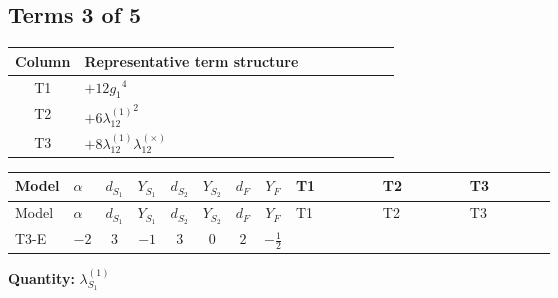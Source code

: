 \documentclass[8pt]{article}
\begin{document}
\begin{landscape}
\subsection*{Terms 3 of 5}
\begin{center}
\begin{tabular}{@{}c >{\raggedright\arraybackslash}p{0.82\linewidth}@{}}
\toprule
Column & Representative term structure \\
\midrule
T1 & \(\displaystyle +12 {g_1}^4\) \\
\midrule
T2 & \(\displaystyle +6 {\lambda_{12}^{(1)}}^2\) \\
\midrule
T3 & \(\displaystyle +8 {\lambda_{12}^{(1)}} {\lambda_{12}^{(\times)}}\) \\
\midrule
\bottomrule
\end{tabular}
\end{center}
\smallskip
\tiny
\begin{longtable}{@{}llcccccc >{\raggedright\arraybackslash}p{0.21\linewidth} >{\raggedright\arraybackslash}p{0.21\linewidth} >{\raggedright\arraybackslash}p{0.21\linewidth}@{}}
\toprule
Model & $\alpha$ & $d_{S_1}$ & $Y_{S_1}$ & $d_{S_2}$ & $Y_{S_2}$ & $d_F$ & $Y_F$ & T1 & T2 & T3 \\
\midrule
\endfirsthead
\toprule
Model & $\alpha$ & $d_{S_1}$ & $Y_{S_1}$ & $d_{S_2}$ & $Y_{S_2}$ & $d_F$ & $Y_F$ & T1 & T2 & T3 \\
\midrule
\endhead
T3-E & $-2$ & $3$ & $-1$ & $3$ & $0$ & $2$ & $-\frac{1}{2}$ & \scriptsize\adjustbox{max width=\linewidth}{$\begin{gathered} +12 {g_1}^4\end{gathered}$} & \scriptsize\adjustbox{max width=\linewidth}{$\begin{gathered} +6 {\lambda_{12}^{(1)}}^2\end{gathered}$} & \scriptsize\adjustbox{max width=\linewidth}{$\begin{gathered} +8 {\lambda_{12}^{(1)}} {\lambda_{12}^{(\times)}}\end{gathered}$} \\
\midrule
\bottomrule
\end{longtable}
\clearpage
\noindent\textbf{Quantity: }$\lambda_{S_1}^{(1)}$\par\smallskip

\end{landscape}
\end{document}
